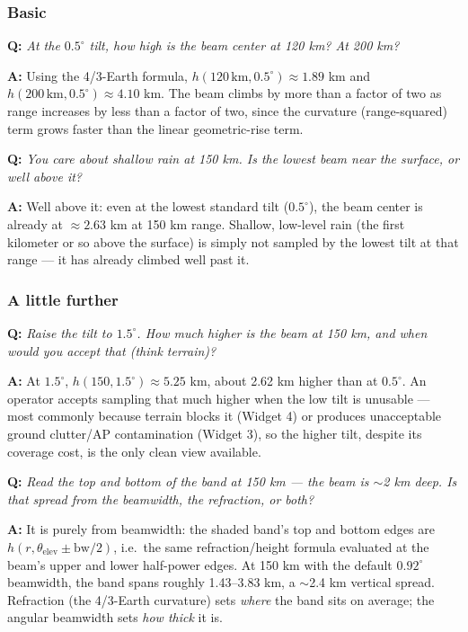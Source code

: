 \documentclass[11pt]{article}
\newenvironment{qa}[1]{\par\noindent\textbf{\color{qgray}Q: }\emph{#1}\par\noindent\textbf{A: }}{\par\vspace{6pt}}
\newcommand{\tier}[1]{\subsubsection*{#1}}
\begin{document}
\tier{Basic}
\begin{qa}{At the $0.5^\circ$ tilt, how high is the beam center at 120 km? At 200 km?}
Using the 4/3-Earth formula, $h(120\,\mathrm{km},0.5^\circ)\approx1.89$ km and $h(200\,\mathrm{km},0.5^\circ)\approx4.10$ km. The beam climbs by more than a factor of two as range increases by less than a factor of two, since the curvature (range-squared) term grows faster than the linear geometric-rise term.
\end{qa}
\begin{qa}{You care about shallow rain at 150 km. Is the lowest beam near the surface, or well above it?}
Well above it: even at the lowest standard tilt ($0.5^\circ$), the beam center is already at $\approx2.63$ km at 150 km range. Shallow, low-level rain (the first kilometer or so above the surface) is simply not sampled by the lowest tilt at that range --- it has already climbed well past it.
\end{qa}

\tier{A little further}
\begin{qa}{Raise the tilt to $1.5^\circ$. How much higher is the beam at 150 km, and when would you accept that (think terrain)?}
At $1.5^\circ$, $h(150,1.5^\circ)\approx5.25$ km, about 2.62 km higher than at $0.5^\circ$. An operator accepts sampling that much higher when the low tilt is unusable --- most commonly because terrain blocks it (Widget 4) or produces unacceptable ground clutter/AP contamination (Widget 3), so the higher tilt, despite its coverage cost, is the only clean view available.
\end{qa}
\begin{qa}{Read the top and bottom of the band at 150 km --- the beam is $\sim$2 km deep. Is that spread from the beamwidth, the refraction, or both?}
It is purely from beamwidth: the shaded band's top and bottom edges are $h(r,\theta_{\mathrm{elev}}\pm\mathrm{bw}/2)$, i.e.\ the same refraction/height formula evaluated at the beam's upper and lower half-power edges. At 150 km with the default $0.92^\circ$ beamwidth, the band spans roughly 1.43--3.83 km, a $\sim$2.4 km vertical spread. Refraction (the 4/3-Earth curvature) sets \emph{where} the band sits on average; the angular beamwidth sets \emph{how thick} it is.
\end{qa}
\end{document}
